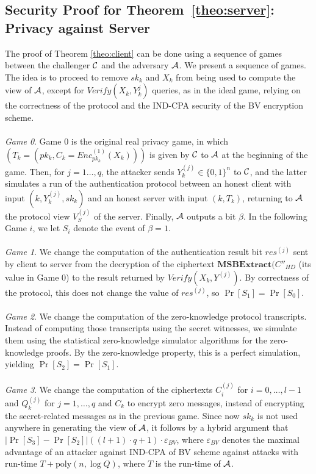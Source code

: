 \subsection{Security Proof for Theorem~\ref{theo:server}: Privacy against Server}
\label{append:ProofsPrivacy}
The proof of Theorem \ref{theo:client} can be done using a sequence of games between the challenger $\mathcal{C}$ and the adversary $\mathcal{A}$. We present a sequence of games. The idea is to proceed to remove $sk_k$ and $X_k$ from being used to compute the view of $\mathcal{A}$, except for $Verify(X_k,Y_k^{j})$ queries, as in the ideal game, relying on the correctness of the protocol and the IND-CPA security of the BV encryption scheme. \\\\
\textit{Game 0}. Game 0 is the original real privacy game, in which $(T_k =(pk_k, C_k = Enc^{(1)}_{pk_k}(X_k)))$ is given by $\mathcal{C}$ to $\mathcal{A}$ at the beginning of the game. Then, for $j=1\ldots,q$, the attacker sends $Y_k^{(j)} \in \{0,1\}^n$ to $\mathcal{C}$, and the latter simulates a run of the authentication protocol between an honest client with input $(k,Y_k^{(j)}, sk_k)$ and an honest server with input $(k,T_k)$, returning to $\mathcal{A}$ the protocol view $V^{(j)}_S$ of the server. Finally, $\mathcal{A}$ outputs a bit $\beta$. In the following Game $i$, we let $S_i$ denote the event of $\beta=1$.\\\\
\textit{Game 1}. We change the computation of the authentication result bit $res^{(j)}$ sent by client to server from the decryption of the ciphertext $\textbf{MSBExtract}(C''_{HD}$ (its value in Game 0) to the result returned by $Verify(X_k, Y^{(j)})$. By correctness of the protocol, this does not change the value of $res^{(j)}$, so $\Pr[S_1] = \Pr[S_0]$. \\\\
\textit{Game 2}. We change the computation of the zero-knowledge protocol transcripts. Instead of computing those transcripts using the secret witnesses, we simulate them using the statistical zero-knowledge simulator algorithms for the zero-knowledge proofs. By the zero-knowledge property, this is a perfect simulation, yielding $\Pr[S_2]= \Pr[S_1]$.\\\\
\textit{Game 3}. We change the computation of the ciphertexts $C^{(j)}_i$ for $i=0,\ldots,l-1$ and $Q^{(j)}_k$ for $j=1,\ldots,q$ and $C_k$ to encrypt zero messages, instead of encrypting the secret-related messages as in the previous game. Since now $sk_k$ is not used anywhere in generating the view of $\mathcal{A}$, it follows by a hybrid argument that $|\Pr[S_3]-\Pr[S_2]| ((l+1) \cdot q + 1) \cdot \varepsilon_{BV}$, where $\varepsilon_{BV}$ denotes the maximal advantage of an attacker against IND-CPA of BV scheme against attacks with run-time $T + \mathrm{poly}(n, \log Q)$, where $T$ is the run-time of $\mathcal{A}$.
